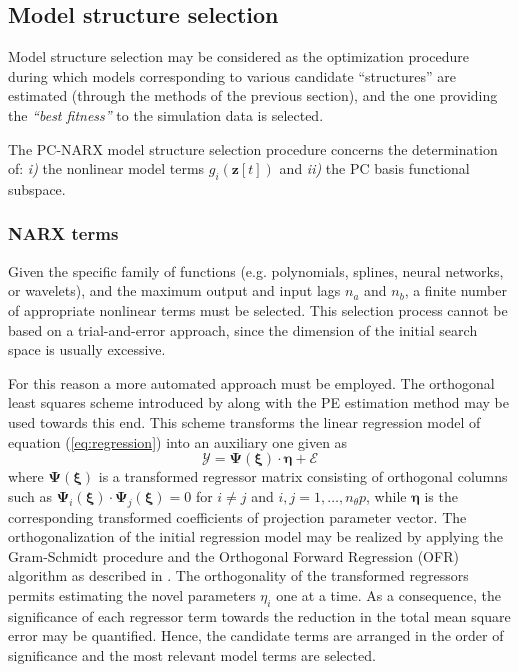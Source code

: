 \documentclass[12pt,a4paper,twocolumn,fleqn]{narms}
\newcommand{\bld}[1]{\boldsymbol{#1}}
\newcommand{\bPsi}{\bld{\Psi}}
\newcommand{\bxi}{\bld{\xi}}
\newcommand{\beq}{\begin{equation}}
\newcommand{\eeq}{\end{equation}}
\begin{document}
\subsection{Model structure selection}\label{sec:MSS}

Model structure selection may be considered as the optimization procedure during which models corresponding to various candidate ``structures'' are estimated (through the methods of the previous section), and the one providing the {\em ``best fitness''} to the simulation data is selected.

The PC-NARX model structure selection procedure concerns the determination of: \emph{i)} the nonlinear model terms $g_i({\bld z}[t])$ and \emph{ii)} the PC basis functional subspace.

\subsubsection{NARX terms}

Given the specific family of functions (e.g. polynomials, splines, neural networks, or wavelets), and the maximum output and input lags $n_a$ and $n_b$, a finite number of appropriate nonlinear terms must be selected. This selection process cannot be based on a trial-and-error approach, since the dimension of the initial search space is usually excessive. 

For this reason a more automated approach must be employed. The orthogonal least squares scheme introduced by  along with the PE estimation method may be used towards this end. This scheme transforms the linear regression model of equation (\ref{eq:regression}) into an auxiliary one given as
%
\beq
{ \mathcal Y} = \bPsi(\bxi) \cdot {\bld \eta}  + {\mathcal E}
\eeq 
%
where $\bPsi(\bxi)$ is a transformed regressor matrix consisting of orthogonal columns such as $\bPsi_i(\bxi) \cdot \bPsi_j(\bxi) = 0 $ for $i \neq j$ and $i,j = 1,\ldots, n_\theta p $, while ${\bld \eta}$ is the corresponding transformed coefficients of projection parameter vector. The orthogonalization of the initial regression model may be realized by applying the Gram-Schmidt procedure and the Orthogonal Forward Regression (OFR) algorithm as described in .
%
The orthogonality of the transformed regressors permits estimating the novel parameters $\eta_i$ one at a time. As a consequence, the significance of each regressor term towards the reduction in the total mean square error may be quantified. Hence, the candidate terms are arranged in the order of significance and the most relevant model terms are selected. 
\end{document}
